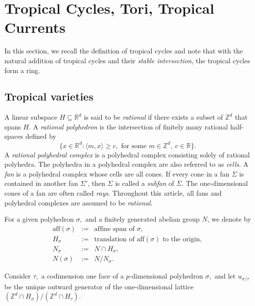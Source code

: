 \documentclass[11pt]{amsart}
\theoremstyle{definition}
\newcommand{\R}{\mathbb{R}}
\newcommand{\Z}{\mathbb{Z}}
\begin{document}
\section{Tropical Cycles, Tori, Tropical Currents}

In this section, we recall the definition of tropical cycles and note that with the natural addition of tropical cycles and their \emph{stable intersection}, the tropical cycles form a ring.

\subsection{Tropical varieties}
A linear subspace $H \subseteq \R^d$ is said to be \textit{rational} if there exists a subset of $\Z^d$ that spans $H$. A \emph{rational polyhedron} is the intersection of finitely many rational half-spaces defined by
\[
\{x \in \R^d : \langle m, x \rangle \geq c, \text{ for some } m \in \Z^d,~ c \in \R \}.
\]
A \emph{rational polyhedral complex} is a polyhedral complex consisting solely of rational polyhedra. The polyhedra in a polyhedral complex are also referred to as \textit{cells}. A \textit{fan} is a polyhedral complex whose cells are all cones. If every cone in a fan $\Sigma$ is contained in another fan $\Sigma'$, then $\Sigma$ is called a \emph{subfan} of $\Sigma$. The one-dimensional cones of a fan are often called \emph{rays}. Throughout this article, all fans and polyhedral complexes are assumed to be \emph{rational}.


\vskip 2mm
For a given polyhedron $\sigma,$ and a finitely generated abelian group $N$, we denote by 
\begin{eqnarray*}
    \text{aff}(\sigma)&:= &\text{affine span of $\sigma$}, \\
    H_{\sigma}&:=& \text{translation of $\text{aff}(\sigma)$ to the origin}, \\
    N_{\sigma} &:=& N \cap H_{\sigma},\\
    N(\sigma)&:=& N/N_{\sigma}.
\end{eqnarray*}



Consider $\tau,$ a codimension one face of a $p$-dimensional polyhedron $\sigma,$ and let $u_{\sigma / \tau }$ be the unique outward generator of the one-dimensional lattice $(\Z^d \cap H_{\sigma})/(\Z^d \cap H_{\tau}).$
\end{document}
